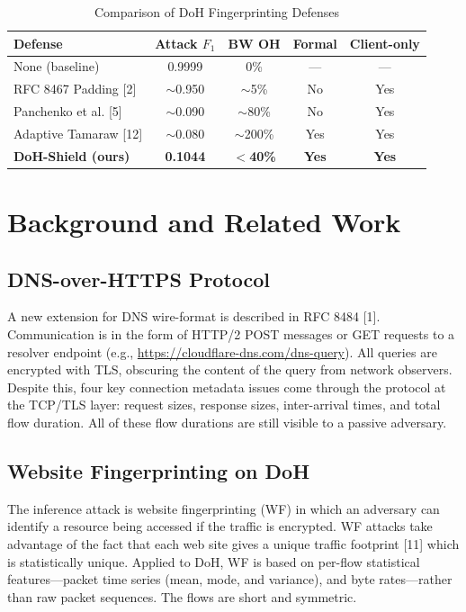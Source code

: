 \documentclass[conference]{IEEEtran}
\begin{document}
\begin{table}[t]
\centering
\caption{Comparison of DoH Fingerprinting Defenses}
\label{tab:comparison_defenses}
\begin{tabular}{lcccc}
\toprule
\textbf{Defense} & \textbf{Attack $F_1$} & \textbf{BW OH} & \textbf{Formal} & \textbf{Client-only} \\
\midrule
None (baseline) & 0.9999 & 0\% & --- & --- \\
RFC 8467 Padding [2] & $\sim$0.950 & $\sim$5\% & No & Yes \\
Panchenko et al. [5] & $\sim$0.090 & $\sim$80\% & No & Yes \\
Adaptive Tamaraw [12] & $\sim$0.080 & $\sim$200\% & Yes & Yes \\
\textbf{DoH-Shield (ours)} & \textbf{0.1044} & \textbf{$<$40\%} & \textbf{Yes} & \textbf{Yes} \\
\bottomrule
\end{tabular}
\end{table}

\section{Background and Related Work}\label{sec:related}

\subsection{DNS-over-HTTPS Protocol}
A new extension for DNS wire-format is described in RFC 8484 [1]. Communication is in the form of HTTP/2 POST messages or GET requests to a resolver endpoint (e.g., \url{https://cloudflare-dns.com/dns-query}). All queries are encrypted with TLS, obscuring the content of the query from network observers. Despite this, four key connection metadata issues come through the protocol at the TCP/TLS layer: request sizes, response sizes, inter-arrival times, and total flow duration. All of these flow durations are still visible to a passive adversary.

\subsection{Website Fingerprinting on DoH}
The inference attack is website fingerprinting (WF) in which an adversary can identify a resource being accessed if the traffic is encrypted. WF attacks take advantage of the fact that each web site gives a unique traffic footprint [11] which is statistically unique. Applied to DoH, WF is based on per-flow statistical features---packet time series (mean, mode, and variance), and byte rates---rather than raw packet sequences. The flows are short and symmetric.
\end{document}
